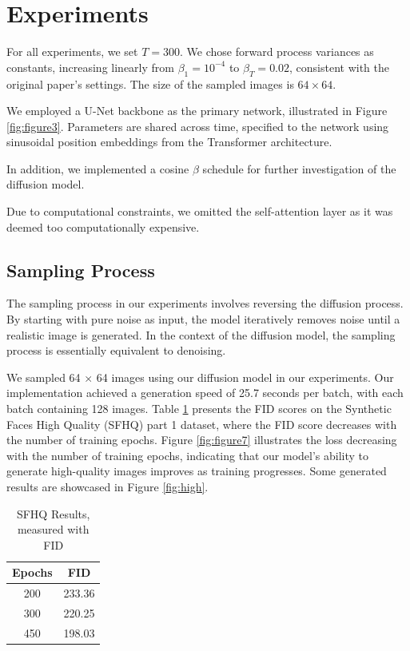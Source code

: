 \documentclass[letterpaper]{article} %
\begin{document}
\section{Experiments}
For all experiments, we set $T = 300$. We chose forward process variances as constants, increasing linearly from $\beta_1=10^{-4}$ to $\beta_T=0.02$, consistent with the original paper's settings. The size of the sampled images is $64 \times 64$.

We employed a U-Net backbone as the primary network, illustrated in Figure \ref{fig:figure3}. Parameters are shared across time, specified to the network using sinusoidal position embeddings from the Transformer architecture.

In addition, we implemented a cosine $\beta$ schedule for further investigation of the diffusion model.

Due to computational constraints, we omitted the self-attention layer as it was deemed too computationally expensive.

\subsection{Sampling Process}
The sampling process in our experiments involves reversing the diffusion process. By starting with pure noise as input, the model iteratively removes noise until a realistic image is generated. In the context of the diffusion model, the sampling process is essentially equivalent to denoising.

We sampled 64 $\times$ 64 images using our diffusion model in our experiments. Our implementation achieved a generation speed of 25.7 seconds per batch, with each batch containing 128 images. Table \ref{tab:FID} presents the FID scores on the Synthetic Faces High Quality (SFHQ) part 1 dataset, where the FID score decreases with the number of training epochs. Figure \ref{fig:figure7} illustrates the loss decreasing with the number of training epochs, indicating that our model's ability to generate high-quality images improves as training progresses. Some generated results are showcased in Figure \ref{fig:high}.

\begin{table}[t]
\caption{SFHQ Results, measured with FID}
\label{tab:FID}
\centering
\begin{tabular}{c|c}
\textbf{Epochs} & \textbf{FID} \\
\hline
        200  & 233.36 \\
        300  & 220.25 \\
        450 & 198.03
\end{tabular}
\end{table}
\end{document}
